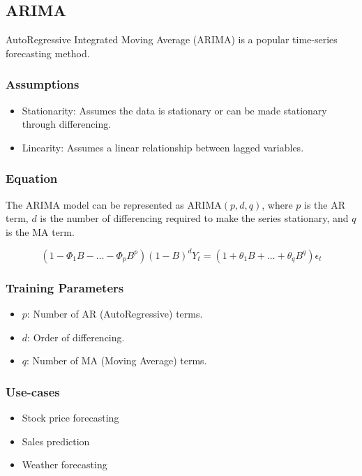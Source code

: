\documentclass[english, threecolumn]{latex4ei/latex4ei_sheet}
\begin{document}
\begin{sectionbox}
\subsection{ARIMA}

AutoRegressive Integrated Moving Average (ARIMA) is a popular time-series forecasting method.

\subsubsection{Assumptions}
\begin{itemize}
    \item Stationarity: Assumes the data is stationary or can be made stationary through differencing.
    \item Linearity: Assumes a linear relationship between lagged variables.
\end{itemize}

\subsubsection{Equation}
The ARIMA model can be represented as ARIMA\((p, d, q)\), where \(p\) is the AR term, \(d\) is the number of differencing required to make the series stationary, and \(q\) is the MA term.

\[
(1 - \Phi_{1}B - \ldots - \Phi_{p}B^{p}) (1 - B)^{d} Y_{t} = (1 + \theta_{1}B + \ldots + \theta_{q}B^{q}) \epsilon_{t}
\]

\subsubsection{Training Parameters}
\begin{itemize}
    \item \(p\): Number of AR (AutoRegressive) terms.
    \item \(d\): Order of differencing.
    \item \(q\): Number of MA (Moving Average) terms.
\end{itemize}

\subsubsection{Use-cases}
\begin{itemize}
    \item Stock price forecasting
    \item Sales prediction
    \item Weather forecasting
\end{itemize}


\end{sectionbox}
\end{document}
